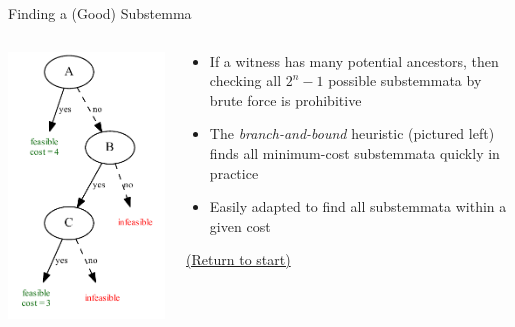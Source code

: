 \documentclass[10pt]{beamer}
\begin{document}
	\begin{frame}{Finding a (Good) Substemma}
		\begin{columns}
			\begin{column}{0.4\textwidth}
				\includegraphics[width=\textwidth]{../graphics/branch-and-bound-example.pdf}
			\end{column}
			\begin{column}{0.55\textwidth}
				\begin{itemize}
					\item If a witness has many potential ancestors, then checking all $2^n - 1$ possible substemmata by brute force is prohibitive
					\item The \emph{branch-and-bound} heuristic (pictured left) finds all minimum-cost substemmata quickly in practice
					\item Easily adapted to find all substemmata within a given cost
				\end{itemize}
				\begin{center}
					\hyperlink{slide:crossroad}{(Return to start)}
				\end{center}
			\end{column}
		\end{columns}
	\end{frame}
\end{document}
